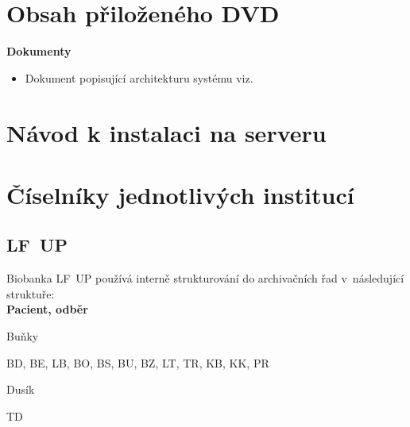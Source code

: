 \renewcommand{\UrlBreaks}{\do\/\do\a\do\b\do\c\do\e\do\f\do\i\do\j\do\k\do\l\do\m\do\n\do\o\do\q\do\r\do\s\do\u\do\v\do\w\do\x\do\y\do\z\do\A\do\B\do\C\do\D\do\E\do\F\do\G\do\H\do\I\do\J\do\K\do\L\do\M\do\N\do\O\do\P\do\Q\do\R\do\S\do\T\do\U\do\V\do\W\do\X\do\Y\do\Z\do\?\do\=\do\-\do\0\do\1\do\3\do\4\do\5\do\6\do\7\do\8\do\9\do\p\do\d\do\h}
\mathchardef{}\relax



\begin{appendix}

\chapter{Obsah přiloženého DVD}
\textbf{Dokumenty}
\begin{itemize}
	\item Dokument popisující architekturu systému viz. \cite{ARCH_2014_1_25}
\end{itemize}

\chapter{Návod k instalaci na serveru}

\chapter{Číselníky jednotlivých institucí}

\section{LF~UP}

Biobanka LF~UP používá interně strukturování do archivačních řad v~následující struktuře:\\ \textbf{Pacient, odběr} 

	\begin{compactitem}
	\item Buňky 
		\begin{compactitem}
			\item BD, BE, LB, BO, BS, BU, BZ, LT, TR, KB, KK, PR
		\end{compactitem}

	\item Dusík 
		\begin{compactitem}
			\item TD
		\end{compactitem}


\end{compactitem}
\end{appendix}
